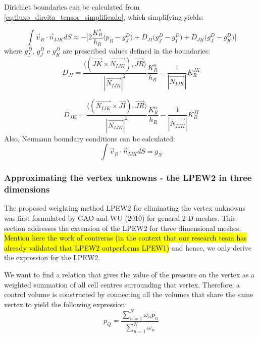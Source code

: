 \documentclass{article}
\begin{document}
Dirichlet boundaries can be calculated from \ref{eq:fluxo_direita_tensor_simplificado}, which simplifying yields:

\begin{equation} \label{eq:fluxo_direita_Dirichlet}
\int{\vec{v}_{R} \cdot \vec{n}_{IJK}dS} 
 \approx -\Bigg[ 2 \frac{K^n_{R}}{h_{R}}\big(p_{R} - g^D_{J}\big)+ D_{JI}\big( g^D_{J} - g^D_{I}\big)  + 
D_{JK}\big( g^D_{J} - g^D_{K} \big)\Bigg]
\end{equation}
where $g^D_{I}$, $g^D_{J}$ e $g^D_{K}$ 
are prescribed values defined in the boundaries:
\begin{displaymath}
D_{JI} = \frac{\langle(\vec{JK} \times \vec{N_{IJK}}), \vec{JR}\rangle}{|\vec{N_{IJK}}| ^2}\frac{K^n_{R}}{h_{R}} - \frac{1}{|\vec{N_{IJK}}|}K^{JK}_{R}
\end{displaymath}

\begin{displaymath}
D_{JK} =  \frac{\langle(\vec{N_{IJK}} \times \vec{JI}), \vec{JR}\rangle}{|\vec{N_{IJK}}| ^2}\frac{K^n_{R}}{h_{R}}  - \frac{1}{|\vec{N_{IJK}}|}K^{JI}_{R}
\end{displaymath}
Also, Neumann boundary conditions can be calculated:
\begin{equation} \label{eq:neumann_bc}
\int{\vec{v}_{R} \cdot \vec{n}_{IJK}dS} = g_{N}
\end{equation}

		\subsubsection{Approximating the vertex unknowns - the LPEW2 in three dimensions}

The proposed weighting method LPEW2 for eliminating the vertex unknowns was first formulated by GAO and WU (2010) for general 2-D meshes. This section addresses the extension of the LPEW2 for three dimensional meshes. \hl{Mention here the work of contreras (in the context that our research team has already validated that LPEW2 outperforms LPEW1)} and hence, we only derive the expression for the LPEW2.
 
We want to find a relation that gives the value of the pressure on the vertex as a weighted summation of all cell centres surrounding that vertex. Therefore, a control volume is constructed by connecting all the volumes that share the same vertex to yield the following expression:
\begin{equation} \label{eq:summ_all_omega}
p_{Q}=\frac{\sum_{n=1}^{N}\omega_{n}p_{n}}{\sum_{n=1}^{N}\omega_{n}}
\end{equation}
\end{document}
